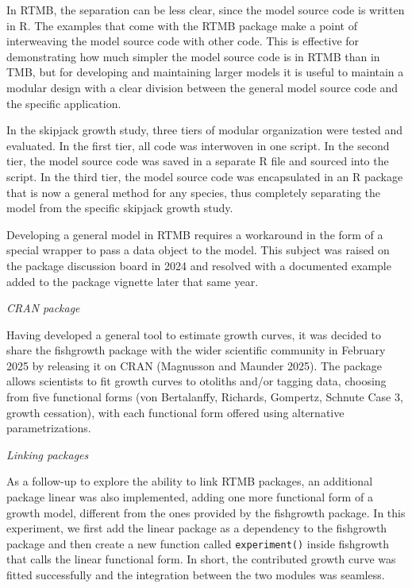 \documentclass{SCreport}
\begin{document}
In RTMB, the separation can be less clear, since the model source code is
written in R. The examples that come with the RTMB package make a point of
interweaving the model source code with other code. This is effective for
demonstrating how much simpler the model source code is in RTMB than in TMB, but
for developing and maintaining larger models it is useful to maintain a modular
design with a clear division between the general model source code and the
specific application.

In the skipjack growth study, three tiers of modular organization were tested
and evaluated. In the first tier, all code was interwoven in one script. In the
second tier, the model source code was saved in a separate R file and sourced
into the script. In the third tier, the model source code was encapsulated in an
R package that is now a general method for any species, thus completely
separating the model from the specific skipjack growth study.

Developing a general model in RTMB requires a workaround in the form of a
special wrapper to pass a data object to the model. This subject was raised on
the package discussion board in 2024 and resolved with a documented example
added to the package vignette later that same year.

\vspace{0.5ex}

\textit{CRAN package}

\vspace{-1ex}

Having developed a general tool to estimate growth curves, it was decided to
share the \textsf{fishgrowth} package with the wider scientific community in
February 2025 by releasing it on CRAN (Magnusson and Maunder 2025). The package
allows scientists to fit growth curves to otoliths and/or tagging data, choosing
from five functional forms (von Bertalanffy, Richards, Gompertz, Schnute Case 3,
growth cessation), with each functional form offered using alternative
parametrizations.

\vspace{0.5ex}

\textit{Linking packages}

\vspace{-1ex}

As a follow-up to explore the ability to link RTMB packages, an additional
package \textsf{linear} was also implemented, adding one more functional form of
a growth model, different from the ones provided by the \textsf{fishgrowth}
package. In this experiment, we first add the \textsf{linear} package as a
dependency to the \textsf{fishgrowth} package and then create a new function
called \texttt{experiment()} inside \textsf{fishgrowth} that calls the
\textsf{linear} functional form. In short, the contributed growth curve was
fitted successfully and the integration between the two modules was seamless.
\end{document}

